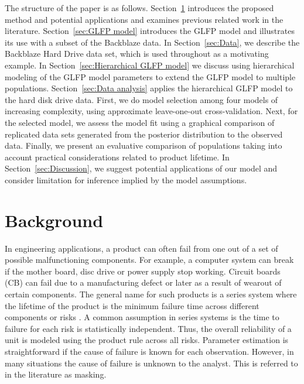 \documentclass[12pt]{article}
\begin{document}
The structure of the paper is as follows. Section~\ref{sec:Background} introduces the proposed method and potential applications and examines previous related work in the literature.  Section~\ref{sec:GLFP model} introduces the GLFP model and illustrates its use with a subset of the Backblaze data.  In Section~\ref{sec:Data}, we describe the Backblaze Hard Drive data set, which is used throughout as a motivating example. In Section~\ref{sec:Hierarchical GLFP model} we discuss using hierarchical modeling of the GLFP model parameters to extend the GLFP model to multiple populations. Section~\ref{sec:Data analysis} applies the hierarchical GLFP model to the hard disk drive data. First, we do model selection among four models of increasing complexity, using approximate leave-one-out cross-validation. Next, for the selected model, we assess the model fit using a graphical comparison of replicated data sets generated from the posterior distribution to the observed data. Finally, we present an evaluative comparison of populations taking into account practical considerations related to product lifetime. In Section~\ref{sec:Discussion}, we suggest potential applications of our model and consider limitation for inference implied by the model assumptions.

\section{Background}
\label{sec:Background}
In engineering applications, a product can often fail from one out of a set of possible malfunctioning components.  For example, a computer system can break if the mother board, disc drive or power supply stop working.  Circuit boards (CB) can fail due to a manufacturing defect or later as a result of wearout of certain components.  The general name for such products is a series system where the lifetime of the product is the minimum failure time across different components or risks \citep[Chapter 5]{nelson}.  A common assumption in series systems is the time to failure for each risk is statistically independent.  Thus, the overall reliability of a unit is modeled using the product rule across all risks.  Parameter estimation is straightforward if the cause of failure is known for each observation.  However, in many situations the cause of failure is unknown to the analyst. This is referred to in the literature as masking.\\
\end{document}
